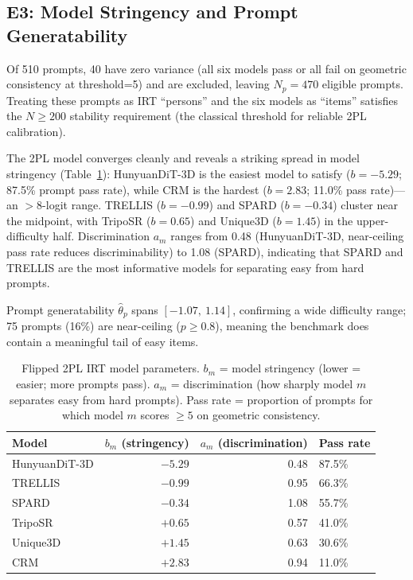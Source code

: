 \documentclass[10pt]{article}
\begin{document}
\subsection{E3: Model Stringency and Prompt Generatability}
\label{sec:e3}

Of 510 prompts, 40 have zero variance (all six models pass or all fail on
geometric consistency at threshold=5) and are excluded, leaving $N_p=470$
eligible prompts.
Treating these prompts as IRT ``persons'' and the six models as ``items''
satisfies the $N\geq200$ stability requirement (the classical threshold
for reliable 2PL calibration).

The 2PL model converges cleanly and reveals a striking spread in model
stringency (Table~\ref{tab:irt}):
HunyuanDiT-3D is the easiest model to satisfy ($b=-5.29$; 87.5\% prompt
pass rate), while CRM is the hardest ($b=2.83$; 11.0\% pass rate)---an
$>8$-logit range.
TRELLIS ($b=-0.99$) and SPARD ($b=-0.34$) cluster near the midpoint,
with TripoSR ($b=0.65$) and Unique3D ($b=1.45$) in the upper-difficulty
half.
Discrimination $a_m$ ranges from 0.48 (HunyuanDiT-3D, near-ceiling pass
rate reduces discriminability) to 1.08 (SPARD), indicating that SPARD and
TRELLIS are the most informative models for separating easy from hard prompts.

Prompt generatability $\hat{\theta}_p$ spans $[-1.07,\ 1.14]$, confirming a
wide difficulty range; 75 prompts (16\%) are near-ceiling ($p\geq0.8$),
meaning the benchmark does contain a meaningful tail of easy items.

\begin{table}[h]
\centering
\small
\caption{Flipped 2PL IRT model parameters. $b_m$ = model stringency
(lower = easier; more prompts pass). $a_m$ = discrimination (how sharply
model $m$ separates easy from hard prompts). Pass rate = proportion of
prompts for which model $m$ scores $\geq5$ on geometric consistency.}
\label{tab:irt}
\begin{tabular}{lrrl}
\toprule
Model & $b_m$ (stringency) & $a_m$ (discrimination) & Pass rate \\
\midrule
HunyuanDiT-3D & $-5.29$ & 0.48 & 87.5\% \\
TRELLIS       & $-0.99$ & 0.95 & 66.3\% \\
SPARD         & $-0.34$ & 1.08 & 55.7\% \\
TripoSR       & $+0.65$ & 0.57 & 41.0\% \\
Unique3D      & $+1.45$ & 0.63 & 30.6\% \\
CRM           & $+2.83$ & 0.94 & 11.0\% \\
\bottomrule
\end{tabular}
\end{table}
\end{document}
